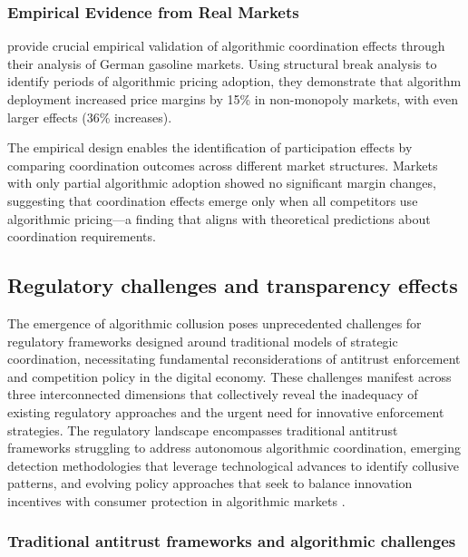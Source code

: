 \subsubsection*{Empirical Evidence from Real Markets}

\textcite{assad_algorithmic_2024} provide crucial empirical validation of algorithmic coordination effects through their analysis of German gasoline markets. Using structural break analysis to identify periods of algorithmic pricing adoption, they demonstrate that algorithm deployment increased price margins by 15\% in non-monopoly markets, with even larger effects (36\% increases).

The empirical design enables the identification of participation effects by comparing coordination outcomes across different market structures. Markets with only partial algorithmic adoption showed no significant margin changes, suggesting that coordination effects emerge only when all competitors use algorithmic pricing---a finding that aligns with theoretical predictions about coordination requirements.

\subsection{Regulatory challenges and transparency effects}

The emergence of algorithmic collusion poses unprecedented challenges for regulatory frameworks designed around traditional models of strategic coordination, necessitating fundamental reconsiderations of antitrust enforcement and competition policy in the digital economy. These challenges manifest across three interconnected dimensions that collectively reveal the inadequacy of existing regulatory approaches and the urgent need for innovative enforcement strategies. The regulatory landscape encompasses traditional antitrust frameworks struggling to address autonomous algorithmic coordination, emerging detection methodologies that leverage technological advances to identify collusive patterns, and evolving policy approaches that seek to balance innovation incentives with consumer protection in algorithmic markets \parencite{ezrachi_sustainable_2020, oecd_algorithmic_2023, harrington_developing_2018}.

\subsubsection*{Traditional antitrust frameworks and algorithmic challenges}

